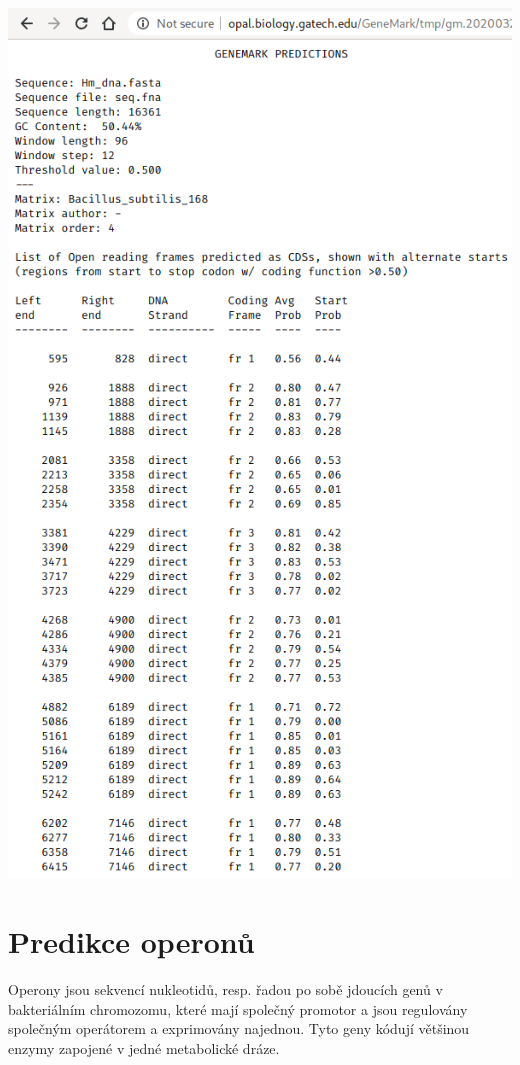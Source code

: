 \documentclass[11pt]{article}
\begin{document}
\begin{center}
\includegraphics[width=1.2\linewidth]{./bif-5-genemark.png}
\end{center}

\section{Predikce operonů}
\label{sec:org5ce5dad}
Operony jsou sekvencí nukleotidů, resp. řadou po sobě jdoucích genů v
bakteriálním chromozomu, které mají společný promotor a jsou regulovány
společným operátorem a exprimovány najednou. Tyto geny kódují většinou enzymy
zapojené v jedné metabolické dráze.
\end{document}
